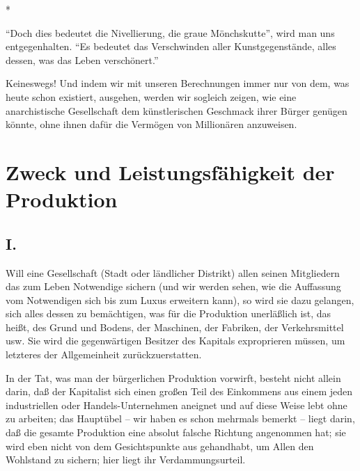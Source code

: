 \documentclass{scrbook}
\begin{document}
\begin{center}*\end{center}

``Doch dies bedeutet die Nivellierung, die graue Mönchskutte'', wird man uns entgegenhalten. ``Es bedeutet das Verschwinden aller Kunstgegenstände, alles dessen, was das Leben verschönert.''

Keineswegs! Und indem wir mit unseren Berechnungen immer nur von dem, was heute schon existiert, ausgehen, werden wir sogleich zeigen, wie eine anarchistische Gesellschaft dem künstlerischen Geschmack ihrer Bürger genügen könnte, ohne ihnen dafür die Vermögen von Millionären anzuweisen.

\chapter{Zweck und Leistungsfähigkeit der Produktion}
\section*{I.}

Will eine Gesellschaft (Stadt oder ländlicher Distrikt) allen seinen Mitgliedern das zum Leben Notwendige sichern (und wir werden sehen, wie die Auffassung vom Notwendigen sich bis zum Luxus erweitern kann), so wird sie dazu gelangen, sich alles dessen zu bemächtigen, was für die Produktion unerläßlich ist, das heißt, des Grund und Bodens, der Maschinen, der Fabriken, der Verkehrsmittel usw. Sie wird die gegenwärtigen Besitzer des Kapitals exproprieren müssen, um letzteres der Allgemeinheit zurückzuerstatten.

In der Tat, was man der bürgerlichen Produktion vorwirft, besteht nicht allein darin, daß der Kapitalist sich einen großen Teil des Einkommens aus einem jeden industriellen oder Handels-Unternehmen aneignet und auf diese Weise lebt ohne zu arbeiten; das Hauptübel – wir haben es schon mehrmals bemerkt – liegt darin, daß die gesamte Produktion eine absolut falsche Richtung angenommen hat; sie wird eben nicht von dem Gesichtspunkte aus gehandhabt, um Allen den Wohlstand zu sichern; hier liegt ihr Verdammungsurteil.
\end{document}
